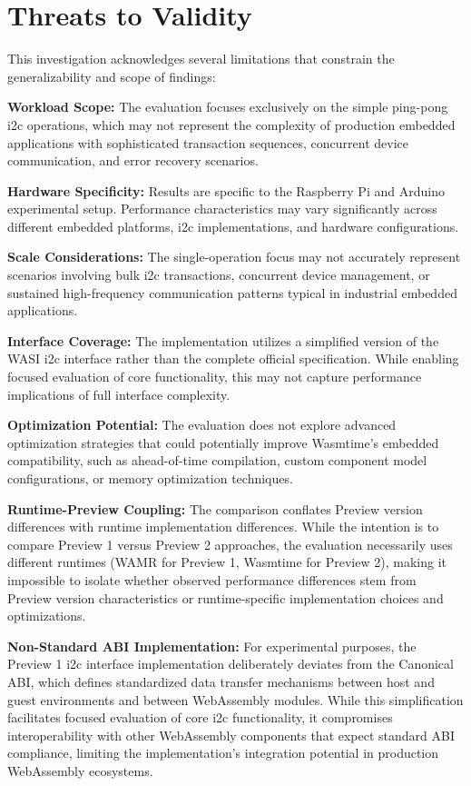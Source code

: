 \section*{Threats to Validity}
\label{sec:limitations}

This investigation acknowledges several limitations that constrain the generalizability and scope of findings:

\textbf{Workload Scope:} The evaluation focuses exclusively on the simple ping-pong \acrshort{i2c} operations, which may not represent the complexity of production embedded applications with sophisticated transaction sequences, concurrent device communication, and error recovery scenarios.

\textbf{Hardware Specificity:} Results are specific to the Raspberry Pi and Arduino experimental setup. Performance characteristics may vary significantly across different embedded platforms, \acrshort{i2c} implementations, and hardware configurations.

\textbf{Scale Considerations:} The single-operation focus may not accurately represent scenarios involving bulk \acrshort{i2c} transactions, concurrent device management, or sustained high-frequency communication patterns typical in industrial embedded applications.

\textbf{Interface Coverage:} The implementation utilizes a simplified version of the WASI \acrshort{i2c} interface rather than the complete official specification. While enabling focused evaluation of core functionality, this may not capture performance implications of full interface complexity.

\textbf{Optimization Potential:} The evaluation does not explore advanced optimization strategies that could potentially improve Wasmtime's embedded compatibility, such as ahead-of-time compilation, custom component model configurations, or memory optimization techniques.

\textbf{Runtime-Preview Coupling:} The comparison conflates Preview version differences with runtime implementation differences. While the intention is to compare Preview 1 versus Preview 2 approaches, the evaluation necessarily uses different runtimes (WAMR for Preview 1, Wasmtime for Preview 2), making it impossible to isolate whether observed performance differences stem from Preview version characteristics or runtime-specific implementation choices and optimizations.

\textbf{Non-Standard ABI Implementation:} For experimental purposes, the Preview 1 \acrshort{i2c} interface implementation deliberately deviates from the Canonical ABI, which defines standardized data transfer mechanisms between host and guest environments and between WebAssembly modules. While this simplification facilitates focused evaluation of core \acrshort{i2c} functionality, it compromises interoperability with other WebAssembly components that expect standard ABI compliance, limiting the implementation's integration potential in production WebAssembly ecosystems.